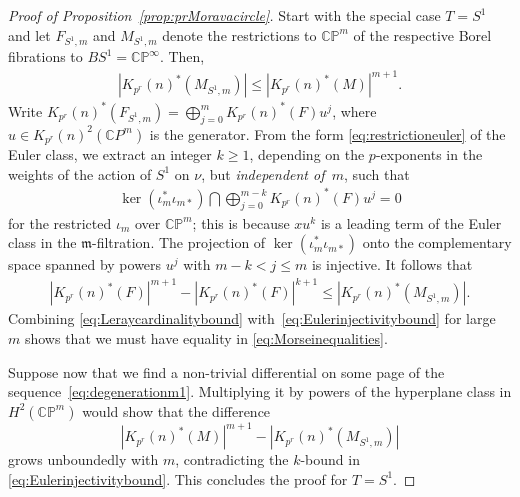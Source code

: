 \documentclass[10pt,a4paper]{amsart}
\begin{document}
\begin{proof}[Proof of Proposition~\ref{prop:prMoravacircle}]
Start with the special case $T=S^1$ and let $F_{S^1,m}$ and $M_{S^1,m}$ denote the restrictions to 
$\mathbb{CP}^m$ of the respective Borel fibrations to $BS^1=\mathbb{CP}^\infty$. Then,  
\begin{align} 
\label{eq:Leraycardinalitybound} 
|K_{p^r}(n)^*(M_{S^1,m})| \leq |K_{p^r}(n)^*(M)|^{m+1}. 
\end{align} 
Write $K_{p^r}(n)^*(F_{S^1,m})=\bigoplus_{j=0}^m K_{p^r}(n)^*(F)u^j$,  where 
$u \in K_{p^r}(n)^2(\mathbb{C}P^m)$ is the generator.  From the form \eqref{eq:restrictioneuler} of the 
Euler class, we extract an integer $k \geq 1$, depending on the $p$-exponents in the weights of 
the action of $S^1$ on $\nu$, but \emph{independent of~$m$}, such that 
\begin{align} 
\label{eq:kernelbound} 
\operatorname{ker}(\iota_m^* \iota_{m*}) \bigcap 
	\bigoplus_{j=0}^{m-k} K_{p^r}(n)^*(F)u^j = 0
\end{align}  
for the restricted $\iota_m$ over $\mathbb{CP}^m$; this is because $xu^k$ is a leading term of the Euler 
class in the $\mathfrak{m}$-filtration. The projection of 
$\operatorname{ker}(\iota_m^* \iota_{m*})$ 
onto the complementary space spanned by powers $u^j$ with 
$m-k< j\le m$ is injective. It follows that
\begin{align}
\label{eq:Eulerinjectivitybound} |K_{p^r}(n)^*(F)|^{m+1}-|K_{p^r}(n)^*(F)|^{k+1} \leq |K_{p^r}(n)^*(M_{S^1,m})|.  
\end{align} 
Combining \eqref{eq:Leraycardinalitybound} with~\eqref{eq:Eulerinjectivitybound} for large $m$ 
shows that we must have equality in \eqref{eq:Morseinequalities}. 

Suppose now that we find a non-trivial differential on some page of the 
sequence~\eqref{eq:degenerationm1}.  Multiplying it  by  powers of the hyperplane class in
$H^2(\mathbb{CP}^m)$ would show that the difference  
\[
|K_{p^r}(n)^*(M)|^{m+1}-|K_{p^r}(n)^*(M_{S^1,m})|
\] 
grows unboundedly with $m$,  contradicting the $k$-bound in \eqref{eq:Eulerinjectivitybound}. 
This concludes the proof for $T=S^1$.  


\end{proof}
\end{document}
